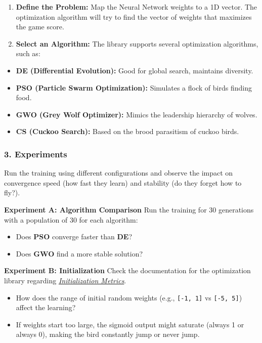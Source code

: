 \documentclass[
  12pt,
]{article}
\providecommand{\tightlist}{%
  \setlength{\itemsep}{0pt}\setlength{\parskip}{0pt}}
\begin{document}
\begin{enumerate}
\def\labelenumi{\arabic{enumi}.}
\tightlist
\item
  \textbf{Define the Problem:} Map the Neural Network weights to a 1D
  vector. The optimization algorithm will try to find the vector of
  weights that maximizes the game score.
\item
  \textbf{Select an Algorithm:} The library supports several
  optimization algorithms, such as:
\end{enumerate}

\begin{itemize}
\tightlist
\item
  \textbf{DE (Differential Evolution):} Good for global search,
  maintains diversity.
\item
  \textbf{PSO (Particle Swarm Optimization):} Simulates a flock of birds
  finding food.
\item
  \textbf{GWO (Grey Wolf Optimizer):} Mimics the leadership hierarchy of
  wolves.
\item
  \textbf{CS (Cuckoo Search):} Based on the brood parasitism of cuckoo
  birds.
\end{itemize}

\subsubsection{3. Experiments}\label{experiments}

Run the training using different configurations and observe the impact
on convergence speed (how fast they learn) and stability (do they forget
how to fly?).

\textbf{Experiment A: Algorithm Comparison} Run the training for 30
generations with a population of 30 for each algorithm:

\begin{itemize}
\tightlist
\item
  Does \textbf{PSO} converge faster than \textbf{DE}?
\item
  Does \textbf{GWO} find a more stable solution?
\end{itemize}

\textbf{Experiment B: Initialization} Check the documentation for the
optimization library regarding
\href{https://mariolpantunes.github.io/pyBlindOpt/pyBlindOpt/init.html}{\emph{Initialization
Metrics}}.

\begin{itemize}
\tightlist
\item
  How does the range of initial random weights (e.g.,
  \texttt{{[}-1,\ 1{]}} vs \texttt{{[}-5,\ 5{]}}) affect the learning?
\item
  If weights start too large, the sigmoid output might saturate (always
  1 or always 0), making the bird constantly jump or never jump.
\end{itemize}
\end{document}
